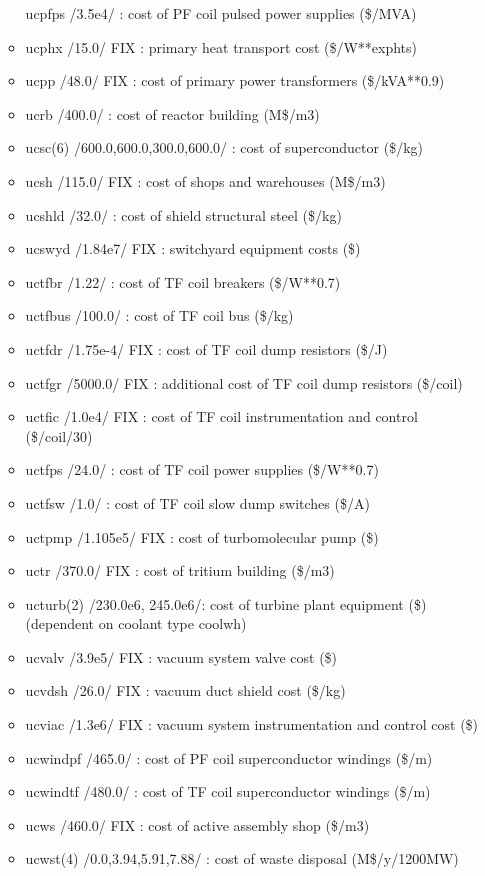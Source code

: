 \documentclass[
]{article}
\begin{document}
\begin{itemize}
\begin{itemize}
    ucpfps /3.5e4/ : cost of PF coil pulsed power supplies (\$/MVA)
  \item
    ucphx /15.0/ FIX : primary heat transport cost (\$/W**exphts)
  \item
    ucpp /48.0/ FIX : cost of primary power transformers (\$/kVA**0.9)
  \item
    ucrb /400.0/ : cost of reactor building (M\$/m3)
  \item
    ucsc(6) /600.0,600.0,300.0,600.0/ : cost of superconductor (\$/kg)
  \item
    ucsh /115.0/ FIX : cost of shops and warehouses (M\$/m3)
  \item
    ucshld /32.0/ : cost of shield structural steel (\$/kg)
  \item
    ucswyd /1.84e7/ FIX : switchyard equipment costs (\$)
  \item
    uctfbr /1.22/ : cost of TF coil breakers (\$/W**0.7)
  \item
    uctfbus /100.0/ : cost of TF coil bus (\$/kg)
  \item
    uctfdr /1.75e-4/ FIX : cost of TF coil dump resistors (\$/J)
  \item
    uctfgr /5000.0/ FIX : additional cost of TF coil dump resistors
    (\$/coil)
  \item
    uctfic /1.0e4/ FIX : cost of TF coil instrumentation and control
    (\$/coil/30)
  \item
    uctfps /24.0/ : cost of TF coil power supplies (\$/W**0.7)
  \item
    uctfsw /1.0/ : cost of TF coil slow dump switches (\$/A)
  \item
    uctpmp /1.105e5/ FIX : cost of turbomolecular pump (\$)
  \item
    uctr /370.0/ FIX : cost of tritium building (\$/m3)
  \item
    ucturb(2) /230.0e6, 245.0e6/: cost of turbine plant equipment (\$)
    (dependent on coolant type coolwh)
  \item
    ucvalv /3.9e5/ FIX : vacuum system valve cost (\$)
  \item
    ucvdsh /26.0/ FIX : vacuum duct shield cost (\$/kg)
  \item
    ucviac /1.3e6/ FIX : vacuum system instrumentation and control cost
    (\$)
  \item
    ucwindpf /465.0/ : cost of PF coil superconductor windings (\$/m)
  \item
    ucwindtf /480.0/ : cost of TF coil superconductor windings (\$/m)
  \item
    ucws /460.0/ FIX : cost of active assembly shop (\$/m3)
  \item
    ucwst(4) /0.0,3.94,5.91,7.88/ : cost of waste disposal
    (M\$/y/1200MW)
  \end{itemize}


\end{itemize}
\end{document}
